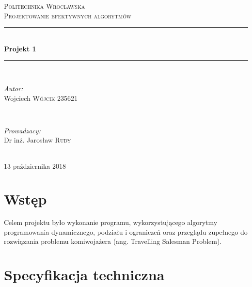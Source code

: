 \documentclass{article}
\begin{document}
\begin{titlepage}

\newcommand{\HRule}{\rule{\linewidth}{0.5mm}}

\center
 
\textsc{\LARGE Politechnika Wroclawska}\\[1.5cm] 
\textsc{\Large Projektowanie efektywnych algorytmów }\\[0.5cm]

\HRule \\[0.5cm]
{ \huge \bfseries Projekt 1}\\[0.5cm]
\HRule \\[1.6cm]
 
 
\begin{minipage}{0.4\textwidth}
\begin{flushleft} \large
\emph{Autor:}\\
Wojciech  \textsc{Wójcik}  235621\\
\end{flushleft}
\end{minipage}
~
\begin{minipage}{0.4\textwidth}
\begin{flushright} \large
\emph{Prowadzacy:} \\
Dr inż. Jarosław  \textsc{Rudy} 
\end{flushright}
\end{minipage}\\[4cm]


\vfill
{\large 13 października 2018}\\[3cm]

\end{titlepage}
   
\newpage
    
\tableofcontents
\newpage

\section{Wstęp}

Celem projektu było wykonanie programu, wykorzystującego algorytmy programowania dynamicznego, podziału i ograniczeń oraz przeglądu zupełnego do rozwiązania problemu komiwojażera
(ang. Travelling Salesman Problem).

\section{Specyfikacja techniczna}
\end{document}
